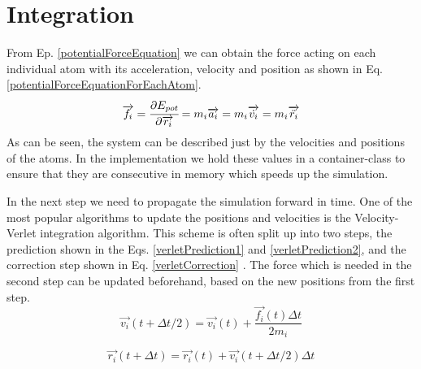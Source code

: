 \section{Integration}
\begin{comment}
- obtain force from the previous equation
- dirivation in v. r.. from the mass
- system can be discribed just by the velocity and postion of each atom
- in the simulation the positions and velocities of the individual atoms have to be tracked and updated accordingly
- most used  is the Velocity-Verlet Algorithm
\end{comment}
From Ep. \ref{potentialForceEquation} we can obtain the force acting on each individual atom with its acceleration, velocity and position as shown in  Eq. \ref{potentialForceEquationForEachAtom}. 
\begin{equation}
	\label{potentialForceEquationForEachAtom}
	\overrightarrow{f_{i}} = \cfrac{\displaystyle\partial E_{pot}}{\displaystyle \partial \overrightarrow{r_{i}}} = m_{i}\overrightarrow{a_{i}} = m_{i}\overrightarrow{\dot{v_{i}}} = m_{i}\overrightarrow{\ddot{r_{i}}}
\end{equation}
As can be seen, the system can be described just by the velocities and positions of the atoms. 
In the implementation we hold these values in a container-class to ensure that they are consecutive in  memory which speeds up the simulation. 
\par
In the next step we need to propagate the simulation forward in time. One of the most popular algorithms to update the positions and velocities is the Velocity-Verlet integration algorithm.
This scheme is often split up into two steps, the prediction shown in the Eqs.  \ref{verletPrediction1} and \ref{verletPrediction2}, and the correction step shown in Eq. \ref{verletCorrection} \cite[cf. ][]{molDymCourse}. The force which is needed in the second step can be updated beforehand, based on the new positions from the first step.
\begin{equation}
	\label{verletPrediction1}
	\overrightarrow{v_{i}}(t+\Delta t/2) = 
	\overrightarrow{v_{i}}(t) + 
	\frac{\overrightarrow{f_{i}}(t)\Delta t}{2m_{i}}
\end{equation}

\begin{equation}
	\label{verletPrediction2}
	\overrightarrow{r_{i}}(t+\Delta t) = 
	\overrightarrow{r_{i}}(t) + \overrightarrow{v_{i}}(t + \Delta t/2)\Delta t
\end{equation}

